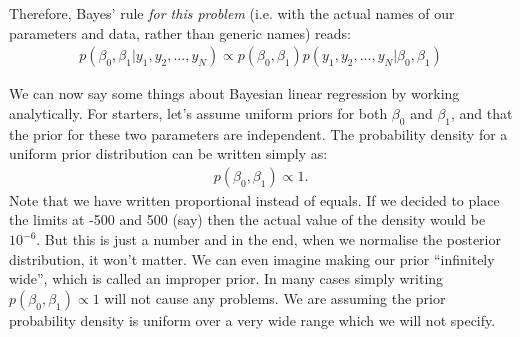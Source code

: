 Therefore, Bayes' rule {\it for this problem} (i.e. with the actual names
of our parameters and data, rather than generic names) reads:
\begin{eqnarray}
p(\beta_0, \beta_1 | y_1, y_2, ..., y_N) \propto
p(\beta_0, \beta_1)p(y_1, y_2, ..., y_N | \beta_0, \beta_1)
\end{eqnarray}

We can now say some things about Bayesian linear regression by working
analytically. For starters, 
let's assume uniform priors for both $\beta_0$ and $\beta_1$, and that the
prior for these two parameters are independent. The probability density for
a uniform prior distribution can be written simply as:
\begin{eqnarray}
p(\beta_0, \beta_1) \propto 1.
\end{eqnarray}
Note that we have written proportional instead of equals. If we decided to
place the limits at -500 and 500 (say) then the actual value of the density
would be $10^{-6}$. But this is just a number and in the end, when we normalise
the posterior distribution, it won't matter. We can even imagine making our
prior ``infinitely wide'', which is called an improper prior. In many cases
simply writing $p(\beta_0, \beta_1) \propto 1$ will not cause any problems. We
are assuming the prior probability density is uniform over a very wide range
which we will not specify.

